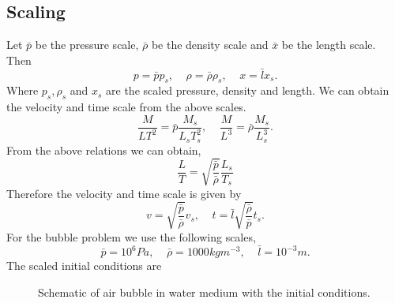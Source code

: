 \documentclass[a4paper]{article}
\begin{document}
\subsection*{Scaling}
Let $\bar{p}$ be the pressure scale, $\bar{\rho}$ be the density scale and $\bar{x}$ be the length scale. Then
\begin{equation}
    p = \bar{p}p_s, \;\;\;\; \rho = \bar{\rho} \rho_s, \;\;\;\; x = \bar{l}x_s. 
\end{equation}
Where $p_s, \rho_s$ and $x_s$ are the scaled pressure, density and length. We can obtain the velocity and time scale from the above scales.
\begin{equation}
    \frac{M}{LT^2} = \bar{p}\frac{M_s}{L_sT^2_s}, \;\;\;\; \frac{M}{L^3} = \bar{\rho}\frac{M_s}{L^3_s}.
\end{equation}
From the above relations we can obtain,
\begin{equation}
    \frac{L}{T} = \sqrt{\frac{\bar{p}}{\bar{\rho}}}\frac{L_s}{T_s}
\end{equation}
Therefore the velocity and time scale is given by
\begin{equation}
    v = \sqrt{\frac{\bar{p}}{\bar{\rho}}} v_s, \;\;\;\; t = \bar{l} \sqrt{\frac{\bar{\rho}}{\bar{p}}} t_s. 
\end{equation}
For the bubble problem we use the following scales,
\begin{equation}
    \bar{p} = 10^6Pa, \;\;\;\; \bar{\rho} = 1000 kgm^{-3}, \;\;\;\; \bar{l} = 10^{-3} m.
\end{equation}
The scaled initial conditions are
\begin{figure}[!h]
    \centering
    \caption{Schematic of air bubble in water medium with the initial conditions.}
    \end{figure}
\end{document}
